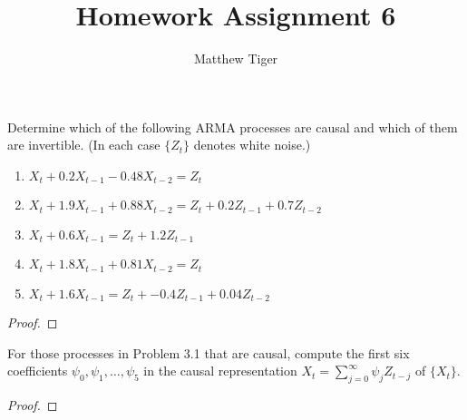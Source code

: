 \documentclass[12pt]{article}
\title{Homework Assignment 6}
\author{Matthew Tiger}
\theoremstyle{definition}
\newenvironment{custompbm}[1]
  {\renewcommand\theproblem{#1}\problem}
  {\endproblem}
\begin{document}
\maketitle


\begin{custompbm}{3.1}
  Determine which of the following ARMA processes are causal and which of them
  are invertible. (In each case $\{ Z_t \}$ denotes white noise.)
  \begin{enumerate}
    \item $X_t + 0.2X_{t-1} - 0.48X_{t-2} = Z_t$
    \item $X_t + 1.9X_{t-1} + 0.88X_{t-2} = Z_t + 0.2Z_{t-1} + 0.7Z_{t-2}$
    \item $X_t + 0.6X_{t-1} = Z_t + 1.2Z_{t-1}$
    \item $X_t + 1.8X_{t-1} + 0.81X_{t-2} = Z_t$
    \item $X_t + 1.6X_{t-1} = Z_t + - 0.4Z_{t-1}  + 0.04Z_{t-2} $
  \end{enumerate}
\end{custompbm}

\begin{proof}
\end{proof}


\begin{custompbm}{3.3}
  For those processes in Problem 3.1 that are causal, compute the first six
  coefficients $\psi_0, \psi_1, \dots, \psi_5$ in the causal representation
  $X_t = \sum_{j=0}^\infty \psi_j Z_{t-j}$ of $\{X_t\}$.
\end{custompbm}

\begin{proof}
\end{proof}
\end{document}
